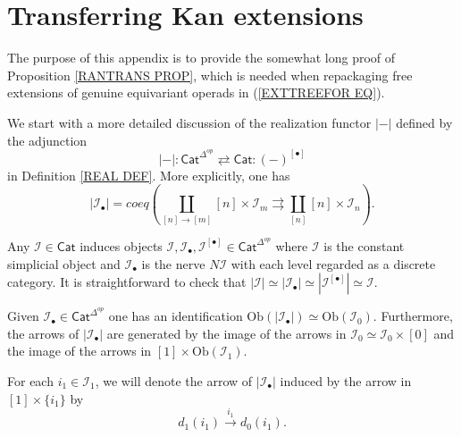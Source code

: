 \documentclass[a4paper,10pt]{article}%
\begin{document}
\appendix


\section{Transferring Kan extensions}
\label{TRANSKAN AP}

The purpose of this appendix is to provide the
somewhat long proof of Proposition \ref{RANTRANS PROP}, 
which is needed when repackaging free extensions of
genuine equivariant operads in (\ref{EXTTREEFOR EQ}).


We start with a more detailed discussion of the realization functor $|\minus|$
defined by the adjunction
	\[
	|\minus|\colon
	\mathsf{Cat}^{\Delta^{op}} 
		\rightleftarrows
	\mathsf{Cat} 
	\colon (\minus)^{[\bullet]}
	\]
in Definition \ref{REAL DEF}.
More explicitly, one has
\begin{equation}\label{REALDEF EQ}
	 |\mathcal{I}_{\bullet}| =
	coeq \left(\coprod_{[n] \to [m]}
	 [n] \times \mathcal{I}_m
	 	\rightrightarrows
	 \coprod_{[n]} [n] \times \mathcal{I}_n
	 \right).
\end{equation}

\begin{example}
Any $\mathcal{I} \in \mathsf{Cat}$ induces objects 
$\mathcal{I},\mathcal{I}_{\bullet},\mathcal{I}^{[\bullet]} \in \mathsf{Cat}^{\Delta^{op}}$ 
where $\mathcal{I}$ is the constant simplicial object and $\mathcal{I}_{\bullet}$ is the nerve $N \mathcal{I}$ with each level regarded as a discrete category.
It is straightforward to check that 
$|\mathcal{I}|\simeq |\mathcal{I}_{\bullet}| \simeq
|\mathcal{I}^{[\bullet]}| \simeq \mathcal{I}$.
\end{example}


\begin{lemma}\label{OBJGENREL LEMMA}
	Given $\mathcal{I}_{\bullet} \in \mathsf{Cat}^{\Delta^{op}}$ one has an identification
	$\text{Ob}(|\mathcal{I}_{\bullet}|) \simeq \text{Ob}(\mathcal{I}_0)$.
	Furthermore, the arrows of $|\mathcal{I}_{\bullet}|$ are generated by the image of the arrows in $\mathcal{I}_0 \simeq \mathcal{I}_0 \times [0]$ and the image of the arrows in 
	$[1] \times \text{Ob}(\mathcal{I}_1)$.
\end{lemma}

For each $i_1 \in \mathcal{I}_1$, we will denote the arrow of 
$|\mathcal{I}_{\bullet}|$ induced by the arrow in $[1] \times \{i_1\}$ by
\[d_1(i_1) \xrightarrow{i_1} d_0(i_1).\]
\end{document}
